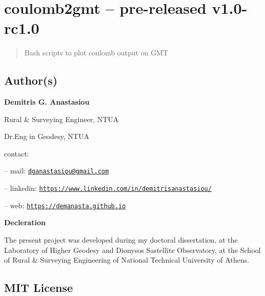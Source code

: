 \section{coulomb2gmt -- pre-released
v1.0-rc1.0}\label{coulomb2gmt-pre-released-v1.0-rc1.0}

\begin{quote}
Bash scripts to plot coulomb output on GMT
\end{quote}
% 

\subsection{Author(s)}\label{authors}

\textbf{Demitris G. Anastasiou}

Rural \& Surveying Engineer, NTUA

Dr.Eng in Geodesy, NTUA

contact:

-- mail: \texttt{\url{dganastasiou@gmail.com}}

-- linkedin: \texttt{\url{https://www.linkedin.com/in/demitrisanastasiou/}}

-- web: \texttt{\url{https://demanasta.github.io}}

\textbf{Decleration}

The present project was developed during my doctoral dissertation, at the Laboratory 
of Higher Geodesy and Dionysos Sastellite Observatory, at the School of Rural \& Surveying
Engineering of National Technical University of Athens.

\subsection{MIT License}

